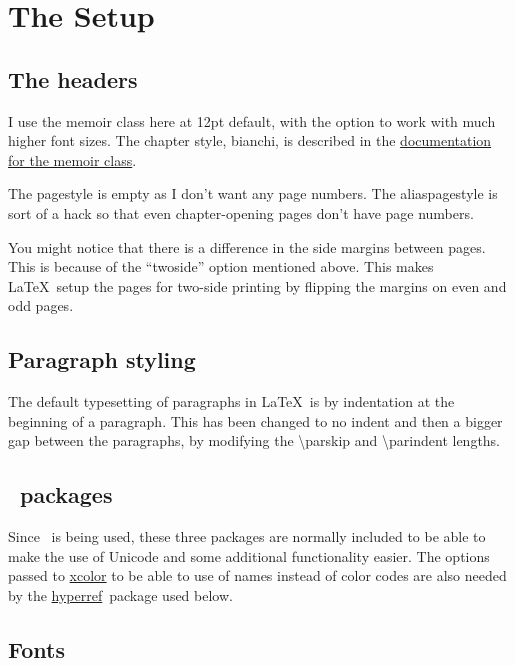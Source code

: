 \documentclass[a4paper,extrafontsizes,12pt,twoside,openany]{memoir}
\newcommand{\showpart}[1]{\noindent}
\newcommand{\HyperRef}{\href{http://www.tug.org/applications/hyperref/manual.html}{hyperref}\ }
\begin{document}
\chapter{The Setup}

\section{The headers}

I use the memoir class here at 12pt default, with the option to work with much higher font sizes. The chapter style,
bianchi, is described in the
\href{ftp://tug.ctan.org/pub/tex-archive/macros/latex/contrib/memoir/memman.pdf}{documentation for the memoir class}.

The pagestyle is empty as I don't want any page numbers. The aliaspagestyle is sort of a hack so that even
chapter-opening pages don't have page numbers.

You might notice that there is a difference in the side margins between pages. This is because of the ``twoside'' option
mentioned above. This makes \LaTeX\ setup the pages for two-side printing by flipping the margins on even and odd pages.

\showpart{HEADER}

\section{Paragraph styling}

The default typesetting of paragraphs in \LaTeX\ is by indentation at the beginning of a paragraph. This has been changed
to no indent and then a bigger gap between the paragraphs, by modifying the \textbackslash{}parskip and \textbackslash{}parindent lengths.

\showpart{PARAGRAPHSTYLES}

\section{\XeTeX\ packages}

Since \XeTeX\ is being used, these three packages are normally included to be able to make the use of Unicode and some additional
functionality easier. The options passed to \href{http://www.ukern.de/tex/xcolor.html}{xcolor} to be able to use of names
instead of color codes are also needed by the \HyperRef package used below.

\showpart{XETEXPACKAGES}

\section{Fonts}
\end{document}
